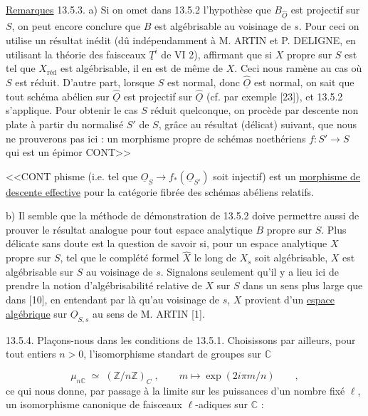 \underline{Remarques} 13.5.3. a) Si on omet dans 13.5.2 l'hypothèse que $B_{\hat{\underline{O}}}$ est projectif sur $S$, on peut encore conclure que $B$ est algébrisable au voisinage de $s$. Pour ceci on utilise un résultat inédit (dû indépendamment à M. ARTIN et P. DELIGNE, en utilisant la théorie des faisceaux $\underline{T}^i$ de VI 2), affirmant que si $X$ propre sur $S$ est tel que $X_{\text{réd}}$ est algébrisable, il en est de même de $X$. Ceci nous ramène au cas où $S$ est réduit. D'autre part, lorsque $S$ est normal, donc $\hat{\underline{O}}$ est normal, on sait que tout schéma abélien sur $\hat{\underline{O}}$ est projectif sur $\hat{\underline{O}}$ (cf. par exemple [23]), et 13.5.2 s'applique. Pour obtenir le cas $S$ réduit quelconque, on procède par descente non plate à partir du normalisé $S'$ de $S$, grâce au résultat (délicat) suivant, que nous ne prouverons pas ici : un morphisme propre de schémas noethériens $f : S' \longrightarrow S$ qui est un épimor CONT>>



<<CONT phisme (i.e. tel que $\underline{O}_S \longrightarrow f_*(\underline{O}_{S'})$ soit injectif) est un \underline{morphisme de descente effective} pour la catégorie fibrée des schémas abéliens relatifs.

b) Il semble que la méthode de démonstration de 13.5.2 doive permettre aussi de prouver le résultat analogue pour tout espace analytique $B$ propre sur $S$. Plus délicate sans doute est la question de savoir si, pour un espace analytique $X$ propre sur $S$, tel que le complété formel $\hat{X}$ le long de $X_s$ soit algébrisable, $X$ est algébrisable sur $S$ au voisinage de $s$. Signalons seulement qu'il y a lieu ici de prendre la notion d'algébrisabilité relative de $X$ sur $S$ dans un sens plus large que dans [10], en entendant par là qu'au voisinage de $s$, $X$ provient d'un \underline{espace algébrique} sur $\underline{O}_{S,s}$ au sens de M. ARTIN [1].

13.5.4. Plaçons-nous dans les conditions de 13.5.1. Choisissons par ailleurs, pour tout entiers $n > 0$, l'isomorphisme standart de groupes sur $\mathbb{C}$

\begin{equation*}
\mu_{n\mathbb{C}} \;\simeq\; (\mathbb{Z}/n\mathbb{Z})_{C} \;,\qquad m \longmapsto \exp(2i\pi m/n) \qquad ,
\end{equation*}
ce qui nous donne, par passage à la limite sur les puissances d'un nombre fixé $\ell$, un isomorphisme canonique de faisceaux $\ell$-adiques sur $\mathbb{C}$ :

